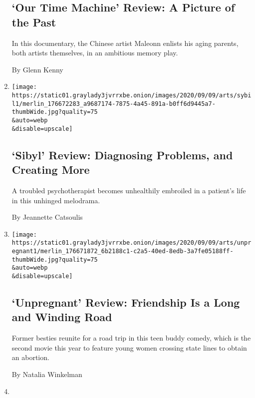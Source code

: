\begin{enumerate}
  \hypertarget{our-time-machine-review-a-picture-of-the-past}{%
  \subsection{`Our Time Machine' Review: A Picture of the
  Past}\label{our-time-machine-review-a-picture-of-the-past}}

  In this documentary, the Chinese artist Maleonn enlists his aging
  parents, both artists themselves, in an ambitious memory play.

  By Glenn Kenny
\item
  \href{/2020/09/10/movies/sibyl-review.html}{}

  \texttt{[image: https://static01.graylady3jvrrxbe.onion/images/2020/09/09/arts/sybil1/merlin\_176672283\_a9687174-7875-4a45-891a-b0ff6d9445a7-thumbWide.jpg?quality=75\\\&auto=webp\\\&disable=upscale]}

  \hypertarget{sibyl-review-diagnosing-problems-and-creating-more}{%
  \subsection{`Sibyl' Review: Diagnosing Problems, and Creating
  More}\label{sibyl-review-diagnosing-problems-and-creating-more}}

  A troubled psychotherapist becomes unhealthily embroiled in a
  patient's life in this unhinged melodrama.

  By Jeannette Catsoulis
\item
  \href{/2020/09/10/movies/unpregnant-review.html}{}

  \texttt{[image: https://static01.graylady3jvrrxbe.onion/images/2020/09/09/arts/unpregnant1/merlin\_176671872\_6b2188c1-c2a5-40ed-8edb-3a7fe05188ff-thumbWide.jpg?quality=75\\\&auto=webp\\\&disable=upscale]}

  \hypertarget{unpregnant-review-friendship-is-a-long-and-winding-road}{%
  \subsection{`Unpregnant' Review: Friendship Is a Long and Winding
  Road}\label{unpregnant-review-friendship-is-a-long-and-winding-road}}

  Former besties reunite for a road trip in this teen buddy comedy,
  which is the second movie this year to feature young women crossing
  state lines to obtain an abortion.

  By Natalia Winkelman
\item
  \href{/2020/09/10/movies/rent-a-pal-review.html}{}


\end{enumerate}
